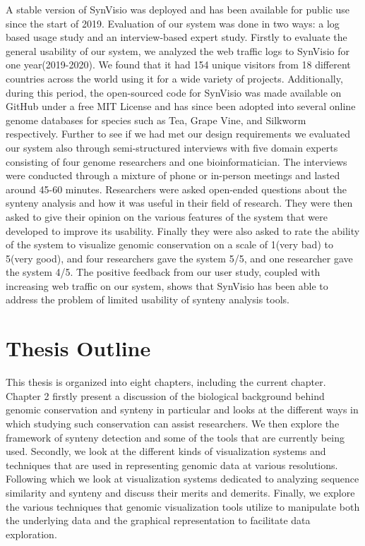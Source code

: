 A stable version of SynVisio was deployed and has been available for public use since the start of 2019. Evaluation of our system was done in two ways: a log based usage study and an interview-based expert study. Firstly to evaluate the general usability of our system, we analyzed the web traffic logs to SynVisio for one year(2019-2020). We found that it had 154 unique visitors from 18 different countries across the world using it for a wide variety of projects. Additionally, during this period, the open-sourced code for SynVisio was made available on GitHub under a free MIT License and has since been adopted into several online genome databases for species such as Tea, Grape Vine, and Silkworm respectively.
Further to see if we had met our design requirements we evaluated our system also  
through semi-structured interviews with five domain experts consisting of four genome researchers and one bioinformatician. The interviews were conducted through a mixture of phone or in-person meetings and lasted around 45-60 minutes. Researchers were asked open-ended questions about the synteny analysis and how it was useful in their field of research. They were then asked to give their opinion on the various features of the system that were developed to improve its usability. Finally they were also asked to rate the ability of the system to visualize genomic conservation on a scale of 1(very bad) to 5(very good), and four researchers gave the system 5/5, and one researcher gave the system 4/5. The positive feedback from our user study, coupled with increasing web traffic on our system, shows that SynVisio has been able to address the problem of limited usability of synteny analysis tools.

\section{Thesis Outline}

This thesis is organized into eight chapters, including the current chapter. Chapter 2 firstly present a discussion of the biological background behind genomic conservation and synteny in particular and looks at the different ways in which studying such conservation can assist researchers. We then explore the framework of synteny detection and some of the tools that are currently being used. Secondly, we look at the different kinds of visualization systems and techniques that are used in representing genomic data at various resolutions. Following which we look at visualization systems dedicated to analyzing sequence similarity and synteny and discuss their merits and demerits. Finally, we explore the various techniques that genomic visualization tools utilize to manipulate both the underlying data and the graphical representation to facilitate data exploration.

